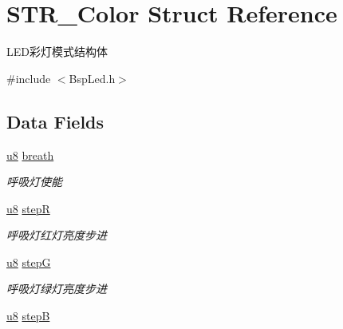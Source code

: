 \hypertarget{struct_s_t_r___color}{\section{\-S\-T\-R\-\_\-\-Color \-Struct \-Reference}
\label{struct_s_t_r___color}
}


\-L\-E\-D彩灯模式结构体  




{\ttfamily \#include $<$\-Bsp\-Led.\-h$>$}

\subsection*{\-Data \-Fields}
\begin{DoxyCompactItemize}
\item 
\hypertarget{struct_s_t_r___color_aa3a8cb2ed4ec77801ff48e1cceb3839a}{\hyperlink{group___b_s_p_gaed742c436da53c1080638ce6ef7d13de}{u8} \hyperlink{struct_s_t_r___color_aa3a8cb2ed4ec77801ff48e1cceb3839a}{breath}}\label{struct_s_t_r___color_aa3a8cb2ed4ec77801ff48e1cceb3839a}

\begin{DoxyCompactList}\small\item\em 呼吸灯使能 \end{DoxyCompactList}\item 
\hypertarget{struct_s_t_r___color_a21e86e3880876d2188d444dbbca3f5ad}{\hyperlink{group___b_s_p_gaed742c436da53c1080638ce6ef7d13de}{u8} \hyperlink{struct_s_t_r___color_a21e86e3880876d2188d444dbbca3f5ad}{step\-R}}\label{struct_s_t_r___color_a21e86e3880876d2188d444dbbca3f5ad}

\begin{DoxyCompactList}\small\item\em 呼吸灯红灯亮度步进 \end{DoxyCompactList}\item 
\hypertarget{struct_s_t_r___color_a3256025cac9812e991fa7692b3feba73}{\hyperlink{group___b_s_p_gaed742c436da53c1080638ce6ef7d13de}{u8} \hyperlink{struct_s_t_r___color_a3256025cac9812e991fa7692b3feba73}{step\-G}}\label{struct_s_t_r___color_a3256025cac9812e991fa7692b3feba73}

\begin{DoxyCompactList}\small\item\em 呼吸灯绿灯亮度步进 \end{DoxyCompactList}\item 
\hypertarget{struct_s_t_r___color_a43d73267b6444994dde4302916f7a6cf}{\hyperlink{group___b_s_p_gaed742c436da53c1080638ce6ef7d13de}{u8} \hyperlink{struct_s_t_r___color_a43d73267b6444994dde4302916f7a6cf}{step\-B}}\label{struct_s_t_r___color_a43d73267b6444994dde4302916f7a6cf}


\end{DoxyCompactItemize}
